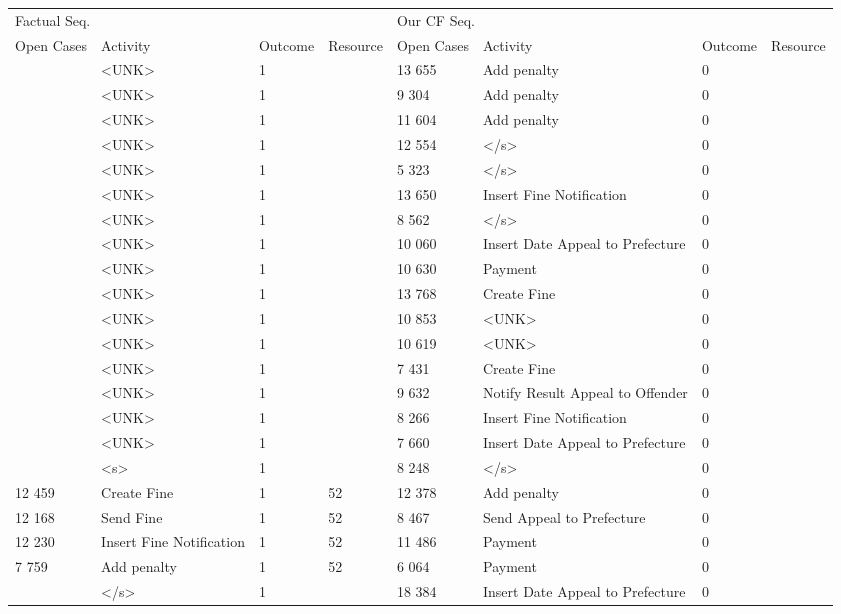 \begin{tabular}{llllllll}
\toprule
\multicolumn{4}{l}{Factual Seq.} & \multicolumn{4}{l}{Our CF Seq.} \\
Open Cases & Activity & Outcome & Resource & Open Cases & Activity & Outcome & Resource \\
\midrule
 & <UNK> & 1 &  & 13 655 & Add penalty & 0 &  \\
 & <UNK> & 1 &  & 9 304 & Add penalty & 0 &  \\
 & <UNK> & 1 &  & 11 604 & Add penalty & 0 &  \\
 & <UNK> & 1 &  & 12 554 & </s> & 0 &  \\
 & <UNK> & 1 &  & 5 323 & </s> & 0 &  \\
 & <UNK> & 1 &  & 13 650 & Insert Fine Notification & 0 &  \\
 & <UNK> & 1 &  & 8 562 & </s> & 0 &  \\
 & <UNK> & 1 &  & 10 060 & Insert Date Appeal to Prefecture & 0 &  \\
 & <UNK> & 1 &  & 10 630 & Payment & 0 &  \\
 & <UNK> & 1 &  & 13 768 & Create Fine & 0 &  \\
 & <UNK> & 1 &  & 10 853 & <UNK> & 0 &  \\
 & <UNK> & 1 &  & 10 619 & <UNK> & 0 &  \\
 & <UNK> & 1 &  & 7 431 & Create Fine & 0 &  \\
 & <UNK> & 1 &  & 9 632 & Notify Result Appeal to Offender & 0 &  \\
 & <UNK> & 1 &  & 8 266 & Insert Fine Notification & 0 &  \\
 & <UNK> & 1 &  & 7 660 & Insert Date Appeal to Prefecture & 0 &  \\
 & <s> & 1 &  & 8 248 & </s> & 0 &  \\
12 459 & Create Fine & 1 & 52 & 12 378 & Add penalty & 0 &  \\
12 168 & Send Fine & 1 & 52 & 8 467 & Send Appeal to Prefecture & 0 &  \\
12 230 & Insert Fine Notification & 1 & 52 & 11 486 & Payment & 0 &  \\
7 759 & Add penalty & 1 & 52 & 6 064 & Payment & 0 &  \\
 & </s> & 1 &  & 18 384 & Insert Date Appeal to Prefecture & 0 &  \\
\bottomrule
\end{tabular}
